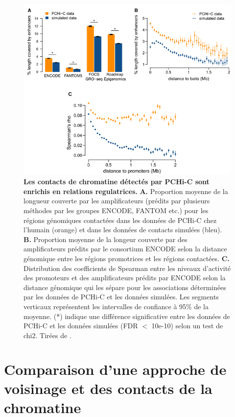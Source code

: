 \begin{figure}[H]
 \centering
 \includegraphics[width=1\textwidth, page=1]{figures/chap2/chap2-fig4.png}
 \caption[Les contacts de chromatine détectés par \gls{PCHi-C} sont enrichis en relations regulatrices.]{
 \textbf{Les contacts de chromatine détectés par \gls{PCHi-C} sont enrichis en relations regulatrices.}
 \textbf{A.} Proportion moyenne de la longueur couverte par les \glspl{amplificateur} (prédits par plusieurs méthodes par les groupes ENCODE, FANTOM etc.) pour les régions génomiques contactées dans les données de \gls{PCHi-C} chez l'humain (orange) et dans les données de contacts simulées (bleu). 
 \textbf{B.} Proportion moyenne de la longeur couverte par des \glspl{amplificateur} prédits par le consortium ENCODE selon la distance génomique entre les régions promotrices et les régions contactées. 
 \textbf{C.} Distribution des coefficients de Spearman entre les niveaux d'activité des promoteurs et des \glspl{amplificateur} prédits par ENCODE selon la distance génomique qui les sépare pour les associations déterminées par les données de \gls{PCHi-C} et les données simulées. Les segments verticaux représentent les intervalles de confiance à 95\% de la moyenne. (*) indique une différence significative entre les données de \gls{PCHi-C} et les données simulées (FDR $<$ 10e-10) selon un test de chi2.
 Tirées de \citep{laverre_long-range_2022}.
 }
 \label{fig:chap2-fig4}
\end{figure} 

\section{Comparaison d’une approche de voisinage et des contacts de la chromatine}
\label{sec:comp-voisinage-contact}

